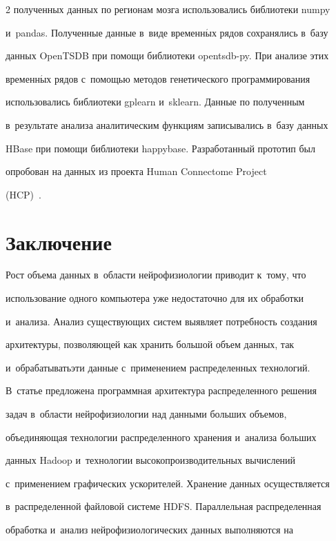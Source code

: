 \begin{multicols}{2}
полученных данных по регионам мозга использовались библиотеки numpy 

и~pandas. Полученные данные в~виде временн$\acute{\mbox{ы}}$х рядов сохранялись в~базу 

данных OpenTSDB при помощи библиотеки opentsdb-py. При анализе этих 

временн$\acute{\mbox{ы}}$х рядов с~помощью методов генетического программирования 

использовались библиотеки gplearn и~sklearn. Данные по полученным 

в~результате анализа аналитическим функциям записывались в~базу данных 

HBase при помощи библиотеки happybase. Разработанный прототип был 

опробован на данных из проекта Human Connectome Project  

(HCP)~\cite{10-st}.



\section{Заключение}



    Рост объема данных в~области нейрофизиологии приводит к~тому, что 

использование одного компьютера уже недостаточно для их обработки 

и~анализа. Анализ существующих систем выявляет потребность создания 

архитектуры, позволяющей как хранить большой объем данных, так 

и~обрабатывать\linebreak эти данные с~применением распределенных технологий. 

В~статье предложена про\-грам\-мная архитектура распределенного решения 

задач в~области нейрофизиологии над данными больших объемов, 

\mbox{объединяющая} технологии распределенного хранения и~анализа больших 

данных Hadoop и~технологии высокопроизводительных вычислений 

с~применением графических ускорителей. Хранение данных осуществляется 

в~распределенной файловой системе HDFS. Параллельная распределенная 

обработка и~анализ нейрофизиологических данных выполняются на 


\end{multicols}
